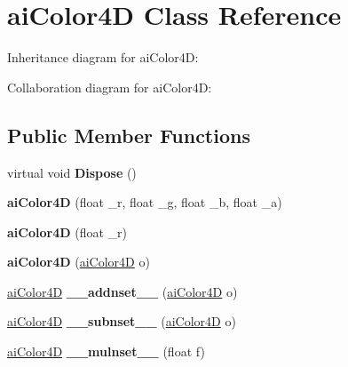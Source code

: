 \hypertarget{structai_color4_d}{\section{ai\+Color4\+D Class Reference}
\label{structai_color4_d}
}


Inheritance diagram for ai\+Color4\+D\+:


Collaboration diagram for ai\+Color4\+D\+:
\subsection*{Public Member Functions}
\begin{DoxyCompactItemize}
\item 
\hypertarget{structai_color4_d_a7d896c0e183c51f421d2ca02713cb286}{virtual void {\bfseries Dispose} ()}\label{structai_color4_d_a7d896c0e183c51f421d2ca02713cb286}

\item 
\hypertarget{structai_color4_d_a3305bc325a143f4fe49c8f5c0fd58af7}{{\bfseries ai\+Color4\+D} (float \+\_\+r, float \+\_\+g, float \+\_\+b, float \+\_\+a)}\label{structai_color4_d_a3305bc325a143f4fe49c8f5c0fd58af7}

\item 
\hypertarget{structai_color4_d_a0e6c3f181e9fda5e53885077529ff1f9}{{\bfseries ai\+Color4\+D} (float \+\_\+r)}\label{structai_color4_d_a0e6c3f181e9fda5e53885077529ff1f9}

\item 
\hypertarget{structai_color4_d_a8a7fafcd4381512c6796d6784812023c}{{\bfseries ai\+Color4\+D} (\hyperlink{structai_color4_d}{ai\+Color4\+D} o)}\label{structai_color4_d_a8a7fafcd4381512c6796d6784812023c}

\item 
\hypertarget{structai_color4_d_a54a57f15685bf006966ee829d7cffab7}{\hyperlink{structai_color4_d}{ai\+Color4\+D} {\bfseries \+\_\+\+\_\+addnset\+\_\+\+\_\+} (\hyperlink{structai_color4_d}{ai\+Color4\+D} o)}\label{structai_color4_d_a54a57f15685bf006966ee829d7cffab7}

\item 
\hypertarget{structai_color4_d_a6cf0c903c22e0694087866b07559e676}{\hyperlink{structai_color4_d}{ai\+Color4\+D} {\bfseries \+\_\+\+\_\+subnset\+\_\+\+\_\+} (\hyperlink{structai_color4_d}{ai\+Color4\+D} o)}\label{structai_color4_d_a6cf0c903c22e0694087866b07559e676}

\item 
\hypertarget{structai_color4_d_a6ca7c2e6d4c0295e86141877236cd35d}{\hyperlink{structai_color4_d}{ai\+Color4\+D} {\bfseries \+\_\+\+\_\+mulnset\+\_\+\+\_\+} (float f)}\label{structai_color4_d_a6ca7c2e6d4c0295e86141877236cd35d}


\end{DoxyCompactItemize}
